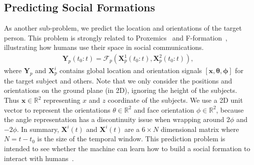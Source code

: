
\subsection{Predicting Social Formations}
As another sub-problem, we predict the location and orientations of the target person. This problem is strongly related to Proxemics~\cite{Hall66} and F-formation~\cite{kendon90}, illustrating how humans use their space in social communications.
\begin{gather}	
 \mathbf{Y}_p (t_0:t) = \mathcal{F}_p \left( \mathbf{X}_p^1(t_0:t), \mathbf{X}_p^2(t_0:t) \right),
 \label{eq:pred_formation}
\end{gather}
where $\mathbf{Y}_p$ and $\mathbf{X}_p^i$ contains global location and orientation signals $[\mathbf{x}, \boldsymbol{\theta}, \boldsymbol{\phi} ]$ for the target subject and others.
Note that we only consider the positions and orientations on the ground plane (in 2D), ignoring the height of the subjects. Thus $\mathbf{x} \in \mathbb{R}^2 $ representing $x$ and $z$ coordinate of the subjects. We use a 2D unit vector to represent the orientations $\theta \in \mathbb {R}^2$ and face orientation $\phi \in \mathbb{R}^2$, because the angle representation has a discontinuity issue when wrapping around $2\phi$ and $-2\phi$. In summary, $\mathbf{X}^i(t)$ and $\mathbf{X}^i(t)$ are a $6 \times N$ dimensional matrix where $N = t- t_0$ is the size of the temporal window. This prediction problem is intended to see whether the machine can learn how to build a social formation to interact with humans~\cite{vazquez2017towards}. %



